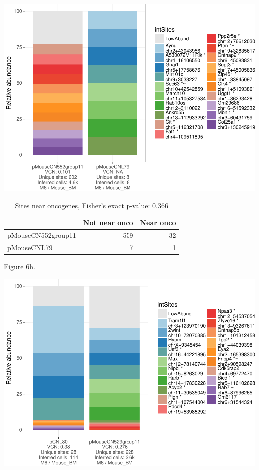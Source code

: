 \documentclass[12pt,]{article}
\begin{document}
\includegraphics{project_files/figure-latex/unnamed-chunk-3-7.pdf}
\vspace{1.0cm}

\begin{table}[!h]

\caption{\label{tab:unnamed-chunk-3}Sites near oncogenes, Fisher's exact p-value: 0.366}
\centering
\begin{tabular}[t]{lrr}
\toprule
  & Not near onco & Near onco\\
\midrule
pMouseCN552group11 & 559 & 32\\
pMouseCNL79 & 7 & 1\\
\bottomrule
\end{tabular}
\end{table}

\newpage

Figure 6h.

\includegraphics{project_files/figure-latex/unnamed-chunk-3-8.pdf}
\vspace{1.0cm}
\end{document}

